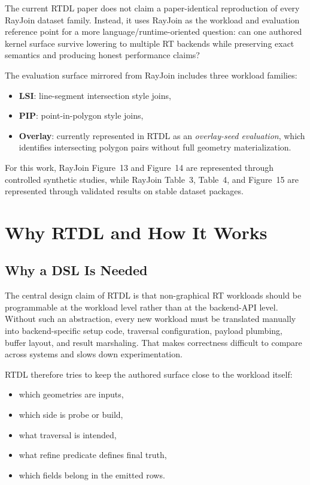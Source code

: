 \documentclass[conference]{IEEEtran}
\begin{document}
The current RTDL paper does not claim a paper-identical reproduction of every
RayJoin dataset family. Instead, it uses RayJoin as the workload and evaluation
reference point for a more language/runtime-oriented question: can one authored
kernel surface survive lowering to multiple RT backends while preserving exact
semantics and producing honest performance claims?

The evaluation surface mirrored from RayJoin includes three workload families:
\begin{itemize}
\item \textbf{LSI}: line-segment intersection style joins,
\item \textbf{PIP}: point-in-polygon style joins,
\item \textbf{Overlay}: currently represented in RTDL as an
\textit{overlay-seed evaluation}, which identifies intersecting polygon pairs
without full geometry materialization.
\end{itemize}

For this work, RayJoin Figure~13 and Figure~14 are represented through
controlled synthetic studies, while RayJoin Table~3, Table~4, and Figure~15
are represented through validated results on stable dataset packages.

\section{Why RTDL and How It Works}

\subsection{Why a DSL Is Needed}

The central design claim of RTDL is that non-graphical RT workloads should be
programmable at the workload level rather than at the backend-API level.
Without such an abstraction, every new workload must be translated manually
into backend-specific setup code, traversal configuration, payload plumbing,
buffer layout, and result marshaling. That makes correctness difficult to
compare across systems and slows down experimentation.

RTDL therefore tries to keep the authored surface close to the workload itself:

\begin{itemize}
\item which geometries are inputs,
\item which side is probe or build,
\item what traversal is intended,
\item what refine predicate defines final truth,
\item which fields belong in the emitted rows.
\end{itemize}
\end{document}
